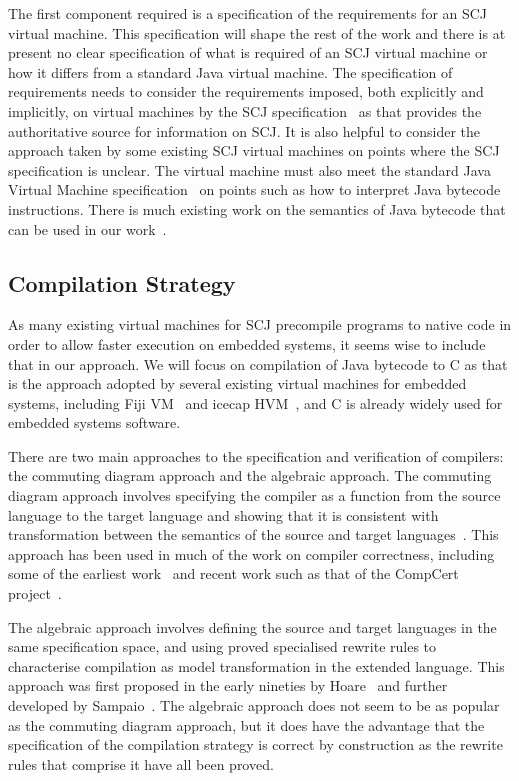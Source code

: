 The first component required is a specification of the requirements
for an SCJ virtual machine.
This specification will shape the rest of the work and there is at
present no clear specification of what is required of an SCJ virtual
machine or how it differs from a standard Java virtual machine.
The specification of requirements needs to consider the requirements
imposed, both explicitly and implicitly, on virtual machines by the
SCJ specification~\cite{locke2013} as that provides the authoritative
source for information on SCJ.
It is also helpful to consider the approach taken by some existing SCJ
virtual machines on points where the SCJ specification is unclear.
The virtual machine must also meet the standard Java Virtual Machine
specification~\cite{lindholm2014} on points such as how to interpret
Java bytecode instructions.
There is much existing work on the semantics of Java bytecode that can
be used in our work~\cite{bertelsen2000, jones1998, stark2001}.

\subsection{Compilation Strategy}

As many existing virtual machines for SCJ precompile programs to
native code in order to allow faster execution on embedded systems, it
seems wise to include that in our approach.
We will focus on compilation of Java bytecode to C as that is the
approach adopted by several existing virtual machines for embedded
systems, including Fiji VM~\cite{pizlo2009} and icecap
HVM~\cite{sondergaard2012}, and C is already widely used for embedded
systems software.

There are two main approaches to the specification and verification of
compilers: the commuting diagram approach and the algebraic approach.
The commuting diagram approach involves specifying the compiler as a
function from the source language to the target language and showing
that it is consistent with transformation between the semantics of the
source and target languages~\cite{morris1973, thatcher1979}.
This approach has been used in much of the work on compiler
correctness, including some of the earliest work~\cite{mccarthy1967}
and recent work such as that of the CompCert project~\cite{leroy2009a,
  leroy2009b}.

The algebraic approach involves defining the source and target
languages in the same specification space, and using proved
specialised rewrite rules to characterise compilation as model
transformation in the extended language.
This approach was first proposed in the early nineties by
Hoare~\cite{hoare1991} and further developed by
Sampaio~\cite{hoare1993, sampaio1993}.
The algebraic approach does not seem to be as popular as the commuting
diagram approach, but it does have the advantage that the
specification of the compilation strategy is correct by construction
as the rewrite rules that comprise it have all been proved.

